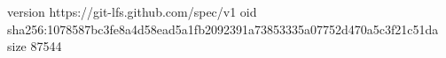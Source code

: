 version https://git-lfs.github.com/spec/v1
oid sha256:1078587bc3fe8a4d58ead5a1fb2092391a73853335a07752d470a5c3f21c51da
size 87544
